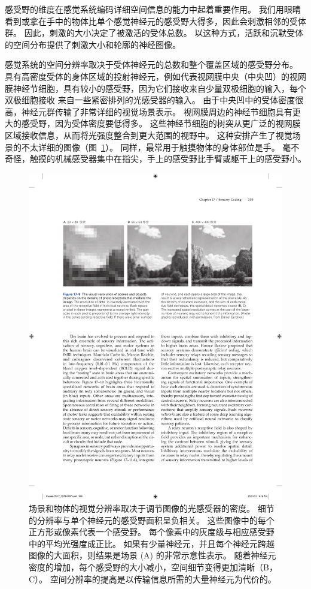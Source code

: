 感受野的维度在感觉系统编码详细空间信息的能力中起着重要作用。 
我们用眼睛看到或拿在手中的物体比单个感觉神经元的感受野大得多，因此会刺激相邻的受体群。 
因此，刺激的大小决定了被激活的受体总数。 
以这种方式，活跃和沉默受体的空间分布提供了刺激大小和轮廓的神经图像。


感觉系统的空间分辨率取决于受体神经元的总数和整个覆盖区域的感受野分布。
具有高密度受体的身体区域的投射神经元，例如代表视网膜中央（中央凹）的视网膜神经节细胞，具有较小的感受野，因为它们接收来自少量双极细胞的输入，每个双极细胞接收 来自一些紧密排列的光感受器的输入。
由于中央凹中的受体密度很高，神经元群传输了非常详细的视觉场景表示。
视网膜周边的神经节细胞具有更大的感受野，因为受体密度要低得多。
这些神经节细胞的树突从更广泛的视网膜区域接收信息，从而将光强度整合到更大范围的视野中。
这种安排产生了视觉场景的不太详细的图像（图~\ref{fig:17_9}）。
同样，最常用于触摸物体的身体部位是手。
毫不奇怪，触摸的机械感受器集中在指尖，手上的感受野比手臂或躯干上的感受野小。


\begin{figure}[htbp]
	\centering
	\includegraphics[width=0.95\linewidth]{chap17/fig_17_9}
	\caption{场景和物体的视觉分辨率取决于调节图像的光感受器的密度。
		细节的分辨率与单个神经元的感受野面积呈负相关。
		这些图像中的每个正方形或像素代表一个感受野。
		每个像素中的灰度级与相应感受野中的平均光强度成正比。
		如果有少量神经元，并且每个神经元跨越图像的大面积，则结果是场景 (A) 的非常示意性表示。 
		随着神经元密度的增加，每个感受野的大小减小，空间细节变得更加清晰（B，C）。
		空间分辨率的提高是以传输信息所需的大量神经元为代价的。}
	\label{fig:17_9}
\end{figure}



